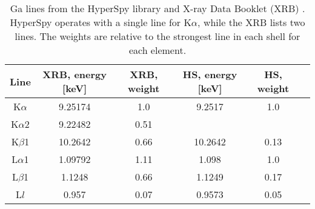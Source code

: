 
\begin{table}[h]
    \centering
    \caption{
        Ga lines from the HyperSpy library \cite{hyperspy_1.7.1} and X-ray Data Booklet (XRB) \cite[Table 1.2 and 1.3]{thompson_x-ray_2004}.
        HyperSpy operates with a single line for K$\alpha$, while the XRB lists two lines.
        The weights are relative to the strongest line in each shell for each element.
    }
    \label{tab:theory:Ga-lines}
    \begin{tabular}{cccccc}
        Line        & XRB, energy [keV] & XRB, weight & HS, energy [keV] & HS, weight \\
        \hline
        K$ \alpha$  & 9.25174           & 1.0         & 9.2517           & 1.0        \\
        K$ \alpha$2 & 9.22482           & 0.51        &                  &            \\
        K$ \beta$1  & 10.2642           & 0.66        & 10.2642          & 0.13       \\
        L$ \alpha$1 & 1.09792           & 1.11        & 1.098            & 1.0        \\
        L$ \beta$1  & 1.1248            & 0.66        & 1.1249           & 0.17       \\
        L$l$        & 0.957             & 0.07        & 0.9573           & 0.05       %
    \end{tabular}
\end{table}